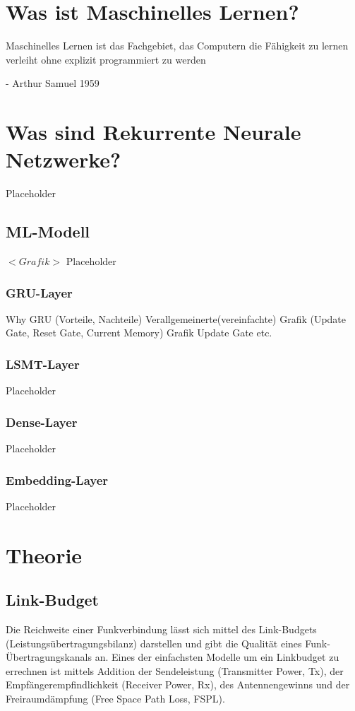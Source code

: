 \documentclass[12pt,a4paper]{article}
\begin{document}
\section{Was ist Maschinelles Lernen?}
Maschinelles Lernen ist das Fachgebiet, das Computern die Fähigkeit zu lernen verleiht ohne explizit programmiert zu werden
\begin{flushright} - Arthur Samuel 1959  \end{flushright}

\section{Was sind Rekurrente Neurale Netzwerke?}
Placeholder

\subsection{ML-Modell}
$<Grafik>$ \newline
Placeholder
\subsubsection{GRU-Layer}
Why GRU (Vorteile, Nachteile) \newline
Verallgemeinerte(vereinfachte) Grafik (Update Gate, Reset Gate, Current Memory)\newline
Grafik Update Gate\newline
etc.
\subsubsection{LSMT-Layer}
Placeholder
\subsubsection{Dense-Layer}
Placeholder
\subsubsection{Embedding-Layer}
Placeholder
\newpage
\section{Theorie}

\subsection{Link-Budget}

Die Reichweite einer Funkverbindung lässt sich mittel des Link-Budgets (Leistungsübertragungsbilanz) darstellen und gibt die Qualität eines Funk-Übertragungskanals an.
Eines der einfachsten Modelle um ein Linkbudget zu errechnen ist mittels Addition der Sendeleistung (Transmitter Power, Tx), der Empfängerempfindlichkeit (Receiver Power, Rx), des Antennengewinns und der Freiraumdämpfung (Free Space Path Loss, FSPL).
\end{document}

